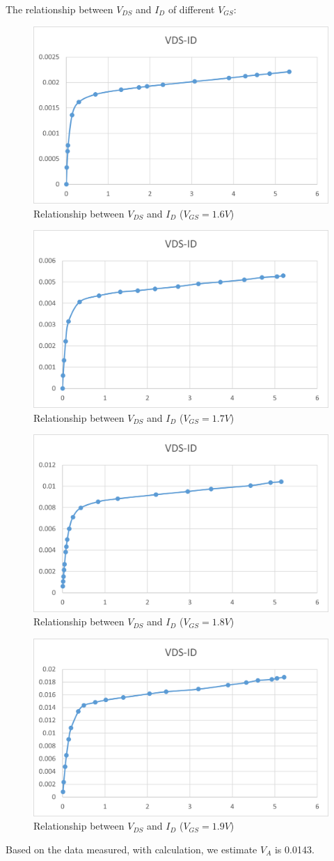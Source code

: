 \FloatBarrier
The relationship between $V_{DS}$ and $I_D$ of different $V_{GS}$:\\
    \begin{figure}[h]
        \centering
        \includegraphics[width=0.5\linewidth]{Lab08/l8_1.6V.png}
        \caption{Relationship between $V_{DS}$ and $I_D$ ($V_{GS}=1.6V$)}
        \label{l816v}
    \end{figure}
\FloatBarrier
    \begin{figure}[h]
        \centering
        \includegraphics[width=0.5\linewidth]{Lab08/l8_1.7V.png}
        \caption{Relationship between $V_{DS}$ and $I_D$ ($V_{GS}=1.7V$)}
        \label{l817v}
    \end{figure}
\FloatBarrier
    \begin{figure}[h]
        \centering
        \includegraphics[width=0.5\linewidth]{Lab08/l8_1.8V.png}
        \caption{Relationship between $V_{DS}$ and $I_D$ ($V_{GS}=1.8V$)}
        \label{l818v}
    \end{figure}
\FloatBarrier
    \begin{figure}[h]
        \centering
        \includegraphics[width=0.5\linewidth]{Lab08/l8_1.9V.png}
        \caption{Relationship between $V_{DS}$ and $I_D$ ($V_{GS}=1.9V$)}
        \label{l819v}
    \end{figure}
\FloatBarrier
Based on the data measured, with calculation, we estimate $V_A$ is 0.0143.


